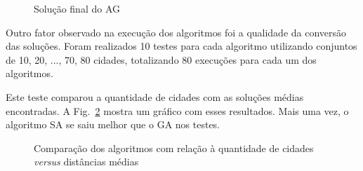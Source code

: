 \documentclass[journal, a4paper]{IEEEtran}
\begin{document}
    \begin{figure}[H]
		\begin{center}
		\caption{Solução final do AG}
		\label{fig:100-genetic}
		\end{center}
	\end{figure}

	Outro fator observado na execução dos algoritmos foi a qualidade da conversão das soluções. Foram realizados 10 testes para cada algoritmo utilizando conjuntos de 10, 20, ..., 70, 80 cidades, totalizando 80 execuções para cada um dos algoritmos.

	Este teste comparou a quantidade de cidades com as soluções médias encontradas. A Fig.~\ref{fig:tests} mostra um gráfico com esses resultados. Mais uma vez, o algoritmo SA se saiu melhor que o GA nos testes.

	\begin{figure}[H]
		\begin{center}
		\caption{Comparação dos algoritmos com relação à quantidade de cidades \textit{versus} distâncias médias}
		\label{fig:tests}
		\end{center}
	\end{figure}
\end{document}
